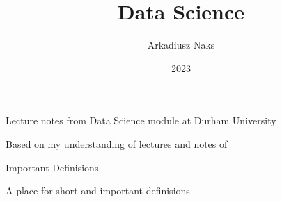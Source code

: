\documentclass[12pt, letterpaper]{article}
\title{Data Science}
\author{Arkadiusz Naks}
\date{2023}
\begin{document}
\begin{titlepage}
  \begin{center}
    \makeatletter
    \vspace*{1cm}
    \Huge
    \textbf{\@title}

    \vspace{0.5cm}
    \Large
    Lecture notes from Data Science module at Durham University

    \vspace{1.5cm}

    \textbf{\@author}

    \vfill

    \vspace{0.8cm}

    \small
    Based on my understanding of lectures and notes of \\
    \@date{}
  \end{center}
\end{titlepage}

\tableofcontents
\newpage

\begin{section}{Important Definisions}

  A place for short and important definisions

\end{section}
\end{document}
